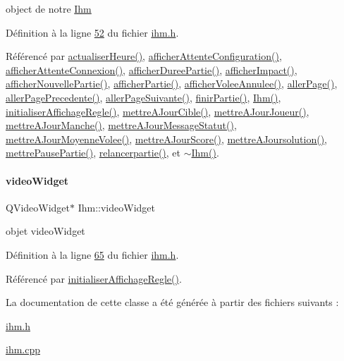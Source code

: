 object de notre \hyperlink{class_ihm}{Ihm} 



Définition à la ligne \hyperlink{ihm_8h_source_l00052}{52} du fichier \hyperlink{ihm_8h_source}{ihm.\+h}.



Référencé par \hyperlink{ihm_8cpp_source_l00127}{actualiser\+Heure()}, \hyperlink{ihm_8cpp_source_l00463}{afficher\+Attente\+Configuration()}, \hyperlink{ihm_8cpp_source_l00473}{afficher\+Attente\+Connexion()}, \hyperlink{ihm_8cpp_source_l00484}{afficher\+Duree\+Partie()}, \hyperlink{ihm_8cpp_source_l00191}{afficher\+Impact()}, \hyperlink{ihm_8cpp_source_l00383}{afficher\+Nouvelle\+Partie()}, \hyperlink{ihm_8cpp_source_l00333}{afficher\+Partie()}, \hyperlink{ihm_8cpp_source_l00353}{afficher\+Volee\+Annulee()}, \hyperlink{ihm_8cpp_source_l00429}{aller\+Page()}, \hyperlink{ihm_8cpp_source_l00439}{aller\+Page\+Precedente()}, \hyperlink{ihm_8cpp_source_l00416}{aller\+Page\+Suivante()}, \hyperlink{ihm_8cpp_source_l00365}{finir\+Partie()}, \hyperlink{ihm_8cpp_source_l00026}{Ihm()}, \hyperlink{ihm_8cpp_source_l00605}{initialiser\+Affichage\+Regle()}, \hyperlink{ihm_8cpp_source_l00565}{mettre\+A\+Jour\+Cible()}, \hyperlink{ihm_8cpp_source_l00242}{mettre\+A\+Jour\+Joueur()}, \hyperlink{ihm_8cpp_source_l00179}{mettre\+A\+Jour\+Manche()}, \hyperlink{ihm_8cpp_source_l00218}{mettre\+A\+Jour\+Message\+Statut()}, \hyperlink{ihm_8cpp_source_l00289}{mettre\+A\+Jour\+Moyenne\+Volee()}, \hyperlink{ihm_8cpp_source_l00141}{mettre\+A\+Jour\+Score()}, \hyperlink{ihm_8cpp_source_l00508}{mettre\+A\+Joursolution()}, \hyperlink{ihm_8cpp_source_l00519}{mettre\+Pause\+Partie()}, \hyperlink{ihm_8cpp_source_l00539}{relancerpartie()}, et \hyperlink{ihm_8cpp_source_l00064}{$\sim$\+Ihm()}.

\mbox{\label{class_ihm_a011827612654af9b19bc8c42045e3c06}} 
\paragraph{\texorpdfstring{video\+Widget}{videoWidget}}
{\footnotesize\ttfamily Q\+Video\+Widget$\ast$ Ihm\+::video\+Widget\hspace{0.3cm}{\ttfamily [private]}}



objet video\+Widget 



Définition à la ligne \hyperlink{ihm_8h_source_l00065}{65} du fichier \hyperlink{ihm_8h_source}{ihm.\+h}.



Référencé par \hyperlink{ihm_8cpp_source_l00605}{initialiser\+Affichage\+Regle()}.



La documentation de cette classe a été générée à partir des fichiers suivants \+:\begin{DoxyCompactItemize}
\item 
\hyperlink{ihm_8h}{ihm.\+h}\item 
\hyperlink{ihm_8cpp}{ihm.\+cpp}\end{DoxyCompactItemize}

